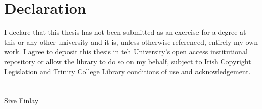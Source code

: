 

\chapter*{Declaration}

I declare that this thesis has not been submitted as an exercise for a degree at this or any other university and it is, unless otherwise referenced, entirely my own work. I agree to deposit this thesis in teh University's open access institutional repository or allow the library to do so on my behalf, subject to Irish Copyright Legislation and Trinity College Library conditions of use and acknowledgement.
\\
\\
\\

Sive Finlay